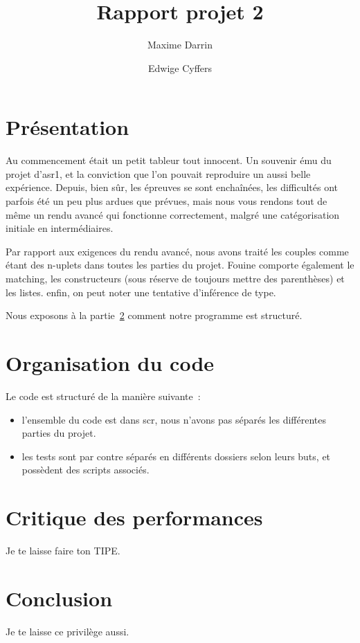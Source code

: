 \documentclass{article}
\title{Rapport projet 2}
\author{Maxime Darrin  \and Edwige Cyffers }
\date{}
\begin{document}
\maketitle

\section{Présentation}

	Au commencement était un petit tableur tout innocent. Un souvenir ému du projet d'asr1, et la conviction que l'on pouvait reproduire un aussi belle expérience. Depuis, bien sûr, les épreuves se sont enchaînées, les difficultés ont parfois été un peu plus ardues que prévues, mais nous vous rendons tout de même un rendu avancé qui fonctionne correctement, malgré une catégorisation initiale en intermédiaires.
	
	Par rapport aux exigences du rendu avancé, nous avons traité les couples comme étant des n-uplets dans toutes les parties du projet. Fouine comporte également le matching, les constructeurs (sous réserve de toujours mettre des parenthèses) et les listes. enfin, on peut noter une tentative d'inférence de type.


	Nous exposons à la partie~\ref{s:orga} comment notre programme est structuré.


\section{Organisation du code}
\label{s:orga}

Le code est structuré de la manière suivante~:
\begin{itemize}
\item l'ensemble du code est dans scr, nous n'avons pas séparés les différentes parties du projet.
\item les tests sont par contre séparés en différents dossiers selon leurs buts, et possèdent des scripts associés. \cite{Landin:1966:NPL:365230.365257}

\end{itemize}

\section{Critique des performances}

	Je te laisse faire ton TIPE.
	
\section{Conclusion}
	Je te laisse ce privilège aussi.



\end{document}
